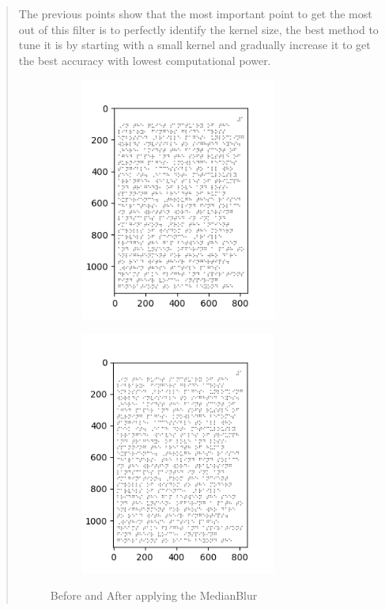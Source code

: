 \begin{quote}
\quad The previous points show that the most important point to get the most
out of this filter is to perfectly identify the kernel size, the best
method to tune it is by starting with a small kernel and gradually
increase it to get the best accuracy with lowest computational power.\\

\begin{figure}[h!]
     \centering
     \begin{subfigure}
         \centering
         \includegraphics[width=.48\textwidth,height=8cm]{image19.png}
     \end{subfigure}
     \hfill
     \begin{subfigure}
         \centering
         \includegraphics[width=.48\textwidth,height=8cm]{image21.png}
     \end{subfigure}
        \caption{Before and After applying the MedianBlur}
        \label{fig:Clear real braille samples}
\end{figure}

\end{quote}
